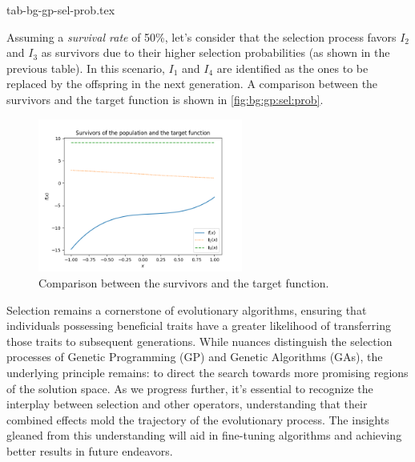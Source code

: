   {tab-bg-gp-sel-prob.tex}

  Assuming a \emph{survival rate} of 50\%, let's consider that the selection
  process favors \(I_2\) and \(I_3\) as survivors due to their higher selection
  probabilities (as shown in the previous table).
  In this scenario, \(I_1\) and \(I_4\) are identified as the ones to be replaced
  by the offspring in the next generation.
  A comparison between the survivors and the target function is shown in
  \vref{fig:bg:gp:sel:prob}.

  \begin{figure}[ht!]
    \centering
    \includegraphics[width=0.6\textwidth]{img/theoretical_framework/gp_pop_sel_survivors.png}
    \caption{Comparison between the survivors and the target function.}
    \label{fig:bg:gp:sel:prob}
  \end{figure}

  Selection remains a cornerstone of evolutionary algorithms, ensuring that 
  individuals possessing beneficial traits have a greater likelihood of 
  transferring those traits to subsequent generations. While nuances 
  distinguish the selection processes of Genetic Programming (GP) and Genetic 
  Algorithms (GAs), the underlying principle remains: to direct the search 
  towards more promising regions of the solution space. As we progress further, 
  it's essential to recognize the interplay between selection and other 
  operators, understanding that their combined effects mold the trajectory of 
  the evolutionary process. The insights gleaned from this understanding will 
  aid in fine-tuning algorithms and achieving better results in future 
  endeavors.
